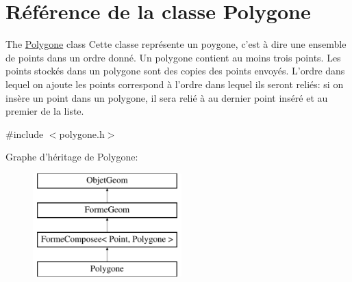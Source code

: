 \hypertarget{class_polygone}{\section{Référence de la classe Polygone}
\label{class_polygone}
}


The \hyperlink{class_polygone}{Polygone} class Cette classe représente un poygone, c'est à dire une ensemble de points dans un ordre donné. Un polygone contient au moins trois points. Les points stockés dans un polygone sont des copies des points envoyés. L'ordre dans lequel on ajoute les points correspond à l'ordre dans lequel ils seront reliés\+: si on insère un point dans un polygone, il sera relié à au dernier point inséré et au premier de la liste.  




{\ttfamily \#include $<$polygone.\+h$>$}

Graphe d'héritage de Polygone\+:\begin{figure}[H]
\begin{center}
\leavevmode
\includegraphics[height=4.000000cm]{class_polygone}
\end{center}
\end{figure}
